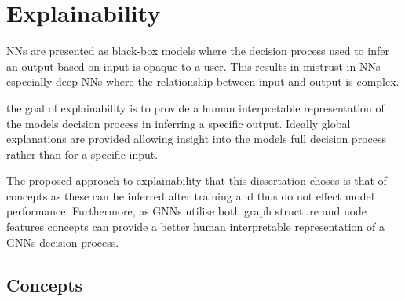 


\section{Explainability}




NNs are presented as black-box models where the decision process used to infer an output based on input is opaque to a user.
This results in mistrust in NNs especially deep NNs where the relationship between input and output is complex.

the goal of explainability is to provide a human interpretable representation of the models decision process in inferring a specific output.
Ideally global explanations are provided allowing insight into the models full decision process rather than for a specific input.

The proposed approach to explainability that this dissertation choses is that of concepts as these can be inferred after training and thus do not effect model performance.
Furthermore, as GNNs utilise both graph structure and node features concepts can provide a better human interpretable representation of a GNNs decision process.

\subsection{Concepts}



